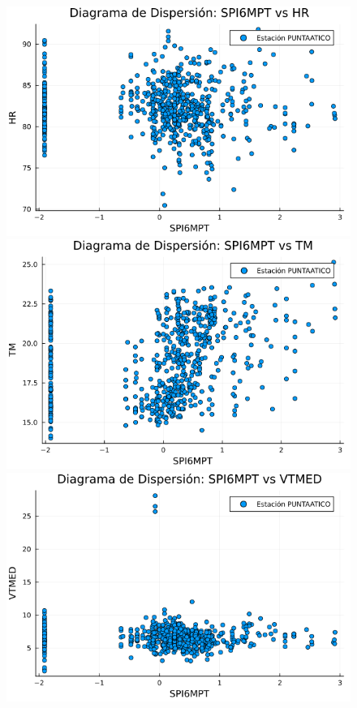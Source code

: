 \begin{figure}[htbp]
\begin{minipage}{0.32\textwidth}
    \centering
    \includegraphics[width=\linewidth]{Capitulos/Scaterplot/PUNTAATICO_SPI6MPT_vs_HR.png}
\end{minipage}\hfill
\begin{minipage}{0.32\textwidth}
    \centering
    \includegraphics[width=\linewidth]{Capitulos/Scaterplot/PUNTAATICO_SPI6MPT_vs_TM.png}
\end{minipage}\hfill
\begin{minipage}{0.32\textwidth}
    \centering
    \includegraphics[width=\linewidth]{Capitulos/Scaterplot/PUNTAATICO_SPI6MPT_vs_VTMED.png}
\end{minipage}


\end{figure}

